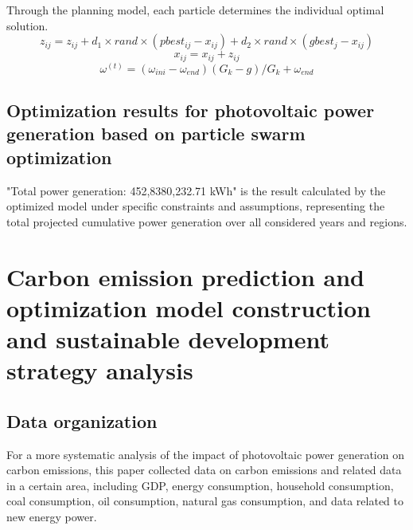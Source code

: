\documentclass{article}
\begin{document}
	Through the planning model, each particle determines the individual optimal solution.
	\begin{equation}
		z_{ij}=z_{ij}+d_{1}\times rand\times(pbest_{ij}-x_{ij}) + d_{2}\times rand\times(gbest_{j}-x_{ij})
	\end{equation}
	\begin{equation}
		x_{ij}=x_{ij}+z_{ij}
	\end{equation}
	\begin{equation}
		\omega^{(t)}=(\omega_{ini}-\omega_{end})(G_{k}-g)/G_{k}+\omega_{end}
	\end{equation}
	
	\subsection{Optimization results for photovoltaic power generation based on particle swarm optimization}
	"Total power generation: 452,8380,232.71 kWh" is the result calculated by the optimized model under specific constraints and assumptions, representing the total projected cumulative power generation over all considered years and regions. 
	
	\section{Carbon emission prediction and optimization model construction and sustainable development strategy analysis}
	\subsection{Data organization}
	For a more systematic analysis of the impact of photovoltaic power generation on carbon emissions, this paper collected data on carbon emissions and related data in a certain area, including GDP, energy consumption, household consumption, coal consumption, oil consumption, natural gas consumption, and data related to new energy power.
	
\end{document}
